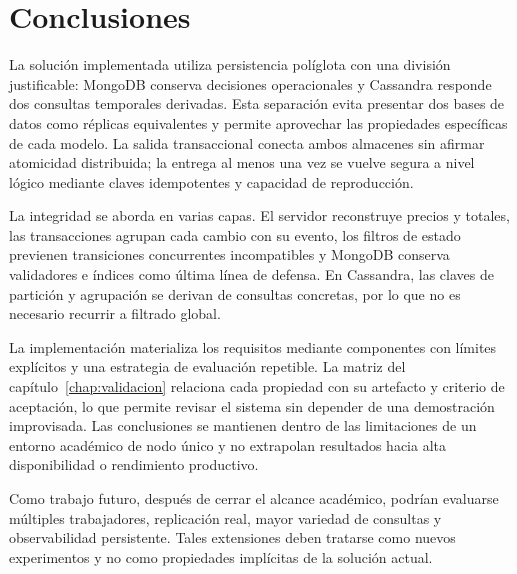 \chapter{Conclusiones}
\label{chap:conclusiones}

La solución implementada utiliza persistencia políglota con una división justificable: MongoDB conserva decisiones operacionales y Cassandra responde dos consultas temporales derivadas. Esta separación evita presentar dos bases de datos como réplicas equivalentes y permite aprovechar las propiedades específicas de cada modelo. La salida transaccional conecta ambos almacenes sin afirmar atomicidad distribuida; la entrega al menos una vez se vuelve segura a nivel lógico mediante claves idempotentes y capacidad de reproducción.

La integridad se aborda en varias capas. El servidor reconstruye precios y totales, las transacciones agrupan cada cambio con su evento, los filtros de estado previenen transiciones concurrentes incompatibles y MongoDB conserva validadores e índices como última línea de defensa. En Cassandra, las claves de partición y agrupación se derivan de consultas concretas, por lo que no es necesario recurrir a filtrado global.

La implementación materializa los requisitos mediante componentes con límites explícitos y una estrategia de evaluación repetible. La matriz del capítulo~\ref{chap:validacion} relaciona cada propiedad con su artefacto y criterio de aceptación, lo que permite revisar el sistema sin depender de una demostración improvisada. Las conclusiones se mantienen dentro de las limitaciones de un entorno académico de nodo único y no extrapolan resultados hacia alta disponibilidad o rendimiento productivo.

Como trabajo futuro, después de cerrar el alcance académico, podrían evaluarse múltiples trabajadores, replicación real, mayor variedad de consultas y observabilidad persistente. Tales extensiones deben tratarse como nuevos experimentos y no como propiedades implícitas de la solución actual.
